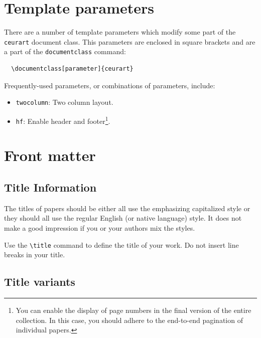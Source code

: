 \documentclass[
]{ceurart}
\begin{document}
\section{Template parameters}

There are a number of template
parameters which modify some part of the \verb|ceurart| document class.
This parameters are enclosed in square
brackets and are a part of the {\verb|documentclass|} command:
\begin{verbatim}
  \documentclass[parameter]{ceurart}
\end{verbatim}

Frequently-used parameters, or combinations of parameters, include:
\begin{itemize}
\item {\verb|twocolumn|}: Two column layout.
\item {\verb|hf|}: Enable header and footer\footnote{You can enable
    the display of page numbers in the final version of the entire
    collection. In this case, you should adhere to the end-to-end
    pagination of individual papers.}.
\end{itemize}

\section{Front matter}

\subsection{Title Information}

The titles of papers should be either all use the emphasizing
capitalized style or they should all use the regular English (or
native language) style. It does not make a good impression if you or
your authors mix the styles.

Use the \verb|\title| command to define the title of your work. Do not
insert line breaks in your title.

\subsection{Title variants}
\end{document}
